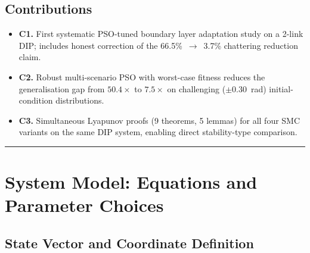 \documentclass[10pt, a4paper]{article}
\begin{document}
\subsection*{Contributions}
\begin{itemize}[leftmargin=1.5em,itemsep=0.2em]
  \item \textbf{C1.} First systematic PSO-tuned boundary layer adaptation study on a
  2-link DIP; includes honest correction of the 66.5\%\ $\to$\ 3.7\% chattering
  reduction claim.
  \item \textbf{C2.} Robust multi-scenario PSO with worst-case fitness reduces the
  generalisation gap from $50.4\times$ to $7.5\times$ on challenging
  ($\pm0.30$~rad) initial-condition distributions.
  \item \textbf{C3.} Simultaneous Lyapunov proofs (9 theorems, 5 lemmas) for all four
  SMC variants on the same DIP system, enabling direct stability-type comparison.
\end{itemize}

\vspace{0.5em}
\noindent\textcolor{headblue}{\rule{\linewidth}{0.4pt}}
\vspace{0.5em}

\clearpage
\tableofcontents
\clearpage

\section{System Model: Equations and Parameter Choices}

\subsection{State Vector and Coordinate Definition}
\end{document}

